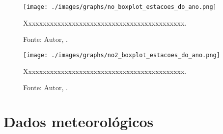 


\lipsum[100]




\begin{figure}[H]
    \centering
    \texttt{[image: ./images/graphs/no\_boxplot\_estacoes\_do\_ano.png]}
    \caption{Xxxxxxxxxxxxxxxxxxxxxxxxxxxxxxxxxxxxxxxxxxxx.}
    \label{fig:no_boxplot_estacoes_do_ano.png}
    \caption*{Fonte: Autor, \imprimirdata.}
\end{figure}




\lipsum[100]




\begin{figure}[H]
    \centering
    \texttt{[image: ./images/graphs/no2\_boxplot\_estacoes\_do\_ano.png]}
    \caption{Xxxxxxxxxxxxxxxxxxxxxxxxxxxxxxxxxxxxxxxxxxxx.}
    \label{fig:no2_boxplot_estacoes_do_ano.png}
    \caption*{Fonte: Autor, \imprimirdata.}
\end{figure}




\lipsum[100]



\section{Dados meteorológicos}


